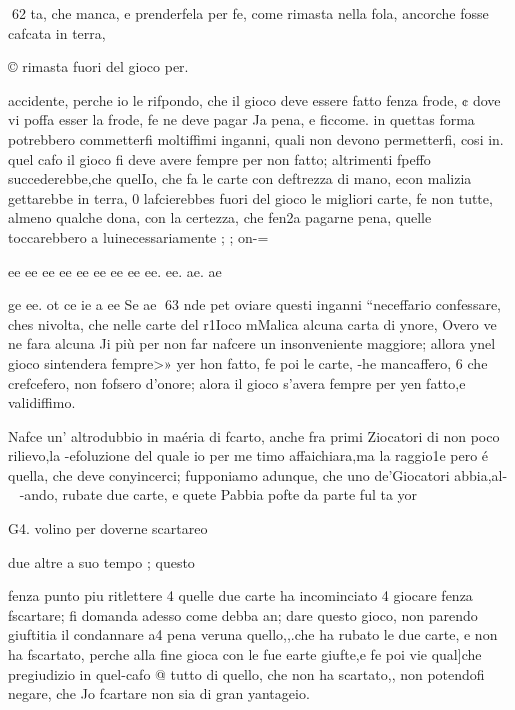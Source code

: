 \documentclass[11pt,a6paper]{article}
\begin{document}
 
62
ta, che manca, e prenderfela
per fe, come rimasta nella fola,
ancorche fosse cafcata in terra,

© rimasta fuori del gioco per.

accidente, perche io le rifpondo, che il gioco deve essere fatto fenza frode, ¢ dove vi poffa
esser la frode, fe ne deve pagar
Ja pena, e ficcome. in quettas
forma potrebbero commetterfi
moltiffimi inganni, quali non
devono permetterfi, cosi in.
quel cafo il gioco fi deve avere
fempre per non fatto; altrimenti fpeffo succederebbe,che quelIo, che fa le carte con deftrezza
di mano, econ malizia gettarebbe in terra, 0 lafcierebbes
fuori del gioco le migliori carte, fe non tutte, almeno qualche
dona, con la certezza, che fen2a pagarne pena, quelle toccarebbero a luinecessariamente ;
; on-=

ee ee ee ee ee ee ee ee ee. ee. ae. ae

ge ee. ot ce ie a ee Se ae
63
nde pet oviare questi inganni
“neceffario confessare, ches
nivolta, che nelle carte del
r1Ioco mMalica alcuna carta di
ynore, Overo ve ne fara alcuna
Ji più per non far nafcere un insonveniente maggiore; allora
ynel gioco sintendera fempre>»
yer hon fatto, fe poi le carte,
-he mancaffero, 6 che crefcefero, non fofsero d’onore; alora il gioco s’avera fempre per
yen fatto,e validiffimo.

Nafce un’ altrodubbio in maéria di fcarto, anche fra primi
Ziocatori di non poco rilievo,la
-efoluzione del quale io per me
timo affaichiara,ma la raggio1e pero é quella, che deve conyincerci; fupponiamo adunque,
che uno de’Giocatori abbia,al-~
-ando, rubate due carte, e quete Pabbia pofte da parte ful ta
yor
 

 

 

 

 

 

 

G4.
volino per doverne scartareo

due altre a suo tempo ; questo

fenza punto piu ritlettere 4 quelle due carte ha incominciato 4
giocare fenza fscartare; fi domanda adesso come debba an;
dare questo gioco, non parendo
giuftitia il condannare a4 pena
veruna quello,,.che ha rubato le
due carte, e non ha fscartato,
perche alla fine gioca con le fue
earte giufte,e fe poi vie qual]che pregiudizio in quel-cafo @
tutto di quello, che non ha scartato,, non potendofi negare, che
Jo fcartare non sia di gran yantageio.
\end{document}
